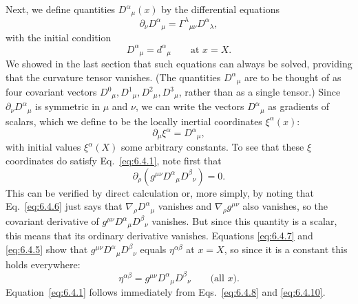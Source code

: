 Next, we define quantities \(D^\alpha{}_\mu(x)\) by the differential equations
\begin{equation}
  \partial_\nu D^\alpha{}_\mu
  =
  \Gamma^\lambda{}_{\mu\nu}D^\alpha{}_\lambda,
  \tag{6.4.6}\label{eq:6.4.6}
\end{equation}
with the initial condition
\begin{equation}
  D^\alpha{}_\mu=d^\alpha{}_\mu
  \qquad\text{at }x=X.
  \tag{6.4.7}\label{eq:6.4.7}
\end{equation}
We showed in the last section that such equations can always be solved,
providing that the curvature tensor vanishes. (The quantities
\(D^\alpha{}_\mu\) are to be thought of as four covariant vectors
\(D^0{}_\mu,D^1{}_\mu,D^2{}_\mu,D^3{}_\mu\), rather than as a single
tensor.) Since \(\partial_\nu D^\alpha{}_\mu\) is symmetric in \(\mu\) and
\(\nu\), we can write the vectors \(D^\alpha{}_\mu\) as gradients of scalars,
which we define to be the locally inertial coordinates \(\xi^\alpha(x)\):
\begin{equation}
  \partial_\mu\xi^\alpha
  =
  D^\alpha{}_\mu,
  \tag{6.4.8}\label{eq:6.4.8}
\end{equation}
with initial values \(\xi^\alpha(X)\) some arbitrary constants. To see that
these \(\xi\) coordinates do satisfy Eq.~\eqref{eq:6.4.1}, note first that
\begin{equation}
  \partial_\rho
  \left(
    g^{\mu\nu}D^\alpha{}_\mu D^\beta{}_\nu
  \right)
  =0.
  \tag{6.4.9}\label{eq:6.4.9}
\end{equation}
This can be verified by direct calculation or, more simply, by noting that
Eq.~\eqref{eq:6.4.6} just says that
\(\nabla_\rho D^\alpha{}_\mu\) vanishes and
\(\nabla_\rho g^{\mu\nu}\) also vanishes, so the covariant derivative of
\(g^{\mu\nu}D^\alpha{}_\mu D^\beta{}_\nu\) vanishes. But since this quantity
is a scalar, this means that its ordinary derivative vanishes. Equations
\eqref{eq:6.4.7} and \eqref{eq:6.4.5} show that
\(g^{\mu\nu}D^\alpha{}_\mu D^\beta{}_\nu\) equals
\(\eta^{\alpha\beta}\) at \(x=X\), so since it is a constant this holds
everywhere:
\begin{equation}
  \eta^{\alpha\beta}
  =
  g^{\mu\nu}D^\alpha{}_\mu D^\beta{}_\nu
  \qquad\text{(all \(x\)).}
  \tag{6.4.10}\label{eq:6.4.10}
\end{equation}
Equation~\eqref{eq:6.4.1} follows immediately from
Eqs.~\eqref{eq:6.4.8} and \eqref{eq:6.4.10}.

